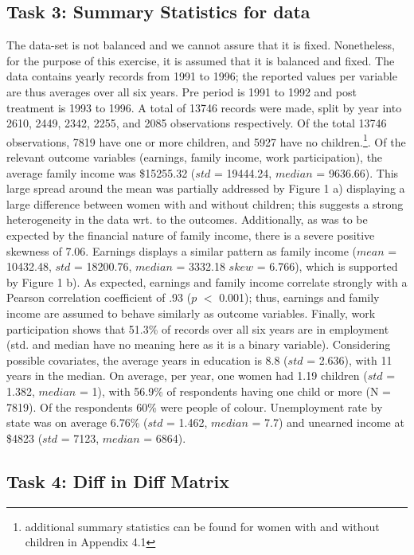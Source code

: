 \documentclass[a4paper]{article}
\begin{document}
\subsection{Task 3: Summary Statistics for data}

The data-set is not balanced and we cannot assure that it is fixed. Nonetheless, for the purpose of this exercise, it is assumed that it is balanced and fixed. The data contains yearly records from 1991 to 1996; the reported values per variable are thus averages over all six years. Pre period is 1991 to 1992 and post treatment is 1993 to 1996. A total of 13746 records were made, split by year into 2610, 2449, 2342, 2255, and 2085 observations respectively. Of the total 13746 observations, 7819 have one or more children, and 5927 have no children.\footnote{additional summary statistics can be found for women with and without children in Appendix 4.1}. Of the relevant outcome variables (earnings, family income, work participation), the average family income was \$15255.32 ($std$ = 19444.24, $median$ = 9636.66). This large spread around the mean was partially addressed by Figure 1 a) displaying a large difference between women with and without children; this suggests a strong heterogeneity in the data wrt. to the outcomes. Additionally, as was to be expected by the financial nature of family income, there is a severe positive skewness of 7.06. Earnings displays a similar pattern as family income ($mean$ = 10432.48, $std$ = 18200.76, $median$ = 3332.18 $skew$ = 6.766), which is supported by Figure 1 b). As expected, earnings and family income correlate strongly with a Pearson correlation coefficient of .93 ($p$ $<$ 0.001); thus, earnings and family income are assumed to behave similarly as outcome variables. Finally, work participation shows that 51.3\% of records over all six years are in employment (std. and median have no meaning here as it is a binary variable). Considering possible covariates, the average years in education is 8.8 ($std$ = 2.636), with 11 years in the median. On average, per year, one women had 1.19 children ($std$ = 1.382, $median$ = 1), with 56.9\% of respondents having one child or more (N = 7819). Of the respondents 60\% were people of colour. Unemployment rate by state was on average 6.76\% ($std$ = 1.462, $median$ = 7.7) and unearned income at \$4823 ($std$ = 7123, $median$ = 6864).

\subsection{Task 4: Diff in Diff Matrix}
\end{document}
